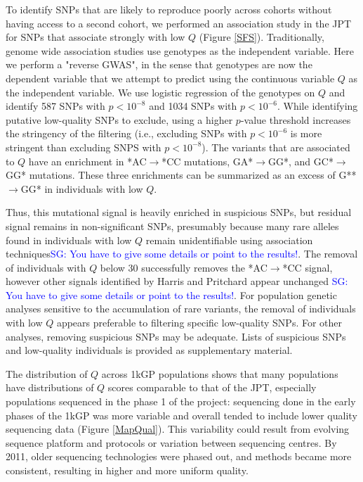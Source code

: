 \documentclass[9pt,lineno]{elife}
\newcommand{\sgcomment}[1]{\textcolor{blue}{SG: #1}}
\begin{document}
To identify SNPs that are likely to reproduce poorly across cohorts without having access to a second cohort, we performed an association study in the JPT for SNPs that associate strongly with low $Q$ (Figure \ref{SFS}).
Traditionally, genome wide association studies use genotypes as the independent variable. 
Here we perform a "reverse GWAS", in the sense that genotypes are now the dependent variable that we attempt to predict using the continuous variable $Q$ as the independent variable.
We use logistic regression of the genotypes on $Q$ and identify 587 SNPs with $p < 10^{-8}$ and 1034 SNPs with $ p < 10^{-6}$. 
While identifying putative low-quality SNPs to exclude, using a higher $p$-value threshold increases the stringency of the filtering (i.e., excluding SNPs with $ p < 10^{-6}$ is more stringent than excluding SNPS with $p < 10^{-8}$). 
The variants that are associated to $Q$ have an enrichment in *AC${\rightarrow}$*CC mutations, GA*${\rightarrow}$GG*, and GC*${\rightarrow}$GG* mutations.
These three enrichments can be summarized as an excess of G**${\rightarrow}$GG* in individuals with low $Q$.

Thus, this mutational signal is heavily enriched in suspicious SNPs, but residual signal remains in non-significant SNPs, presumably because many rare alleles found in individuals with low $Q$ remain unidentifiable using association techniques\sgcomment{You have to give some details or point to the results!}. 
The removal of individuals with $Q$ below 30 successfully removes the *AC${\rightarrow}$*CC signal, however other signals identified by Harris and Pritchard appear unchanged \sgcomment{You have to give some details or point to the results!}. 
For population genetic analyses sensitive to the accumulation of rare variants, the removal of individuals with low $Q$ appears preferable to filtering specific low-quality SNPs. 
For other analyses, removing suspicious SNPs may be adequate. 
Lists of suspicious SNPs and low-quality individuals is provided as supplementary material.

The distribution of $Q$ across 1kGP populations shows that many populations have distributions of $Q$ scores comparable to that of the JPT, especially populations sequenced in the phase 1 of the project: sequencing done in the early phases of the 1kGP was more variable and overall tended to include lower quality sequencing data (Figure \ref{MapQual}).
This variability could result from evolving sequence platform and protocols or variation between sequencing centres. 
By 2011, older sequencing technologies were phased out, and methods became more consistent, resulting in higher and more uniform quality.
\end{document}
